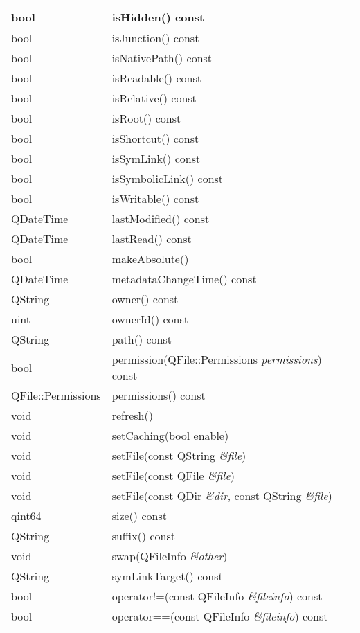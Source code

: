 \begin{longtable}{|l|l|}
\hline
bool& 	isHidden() const\\
\hline
bool& 	isJunction() const\\
\hline
bool& 	isNativePath() const\\
\hline
bool& 	isReadable() const\\
\hline
bool& 	isRelative() const\\
\hline
bool& 	isRoot() const\\
\hline
bool& 	isShortcut() const\\
\hline
bool& 	isSymLink() const\\
\hline
bool& 	isSymbolicLink() const\\
\hline
bool& 	isWritable() const\\
\hline
QDateTime& 	lastModified() const\\
\hline
QDateTime& 	lastRead() const\\
\hline
bool& 	makeAbsolute()\\
\hline
QDateTime& 	metadataChangeTime() const\\
\hline
QString& 	owner() const\\
\hline
uint& 	ownerId() const\\
\hline
QString& 	path() const\\
\hline
bool& 	permission(QFile::Permissions \emph{permissions}) const\\
\hline
QFile::Permissions& 	permissions() const\\
\hline
void& 	refresh()\\
\hline
void& 	setCaching(bool enable)\\
\hline
void& 	setFile(const QString \emph{\&file})\\
\hline
void& 	setFile(const QFile \emph{\&file})\\
\hline
void& 	setFile(const QDir \emph{\&dir}, const QString \emph{\&file})\\
\hline
qint64& 	size() const\\
\hline
QString& 	suffix() const\\
\hline
void& 	swap(QFileInfo \emph{\&other})\\
\hline
QString& 	symLinkTarget() const\\
\hline
bool& 	operator!=(const QFileInfo \emph{\&fileinfo}) const\\
\hline
bool& 	operator==(const QFileInfo \emph{\&fileinfo}) const\\
\hline
\end{longtable}

\splitLine

